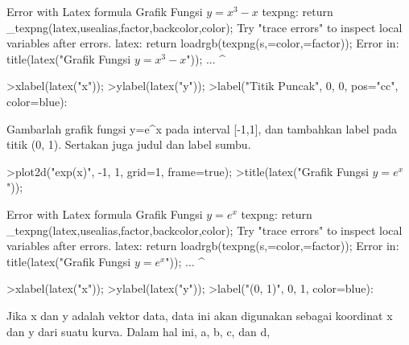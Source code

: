 \documentclass{article}
\begin{document}
\begin{eulernotebook}
\begin{eulercomment}
\begin{eulercomment}
\begin{eulercomment}
\begin{eulercomment}
\begin{eulercomment}
\begin{eulercomment}
\begin{eulercomment}
\begin{eulercomment}
\begin{eulercomment}
\begin{eulercomment}
\begin{eulercomment}
\begin{eulercomment}
\begin{eulercomment}
\begin{eulercomment}
\begin{eulercomment}
\begin{eulercomment}
\begin{eulercomment}
\begin{eulercomment}
\begin{eulerprompt}
\end{eulerprompt}
\begin{euleroutput}
  Error with Latex formula
  Grafik Fungsi $y = x^3 - x$
  texpng:
      return _texpng(latex,usealias,factor,backcolor,color);
  Try "trace errors" to inspect local variables after errors.
  latex:
      return loadrgb(texpng(s,=color,=factor));
  Error in:
  title(latex("Grafik Fungsi $y = x^3 - x$")); ...
                                            ^
\end{euleroutput}
\begin{eulerprompt}
>xlabel(latex("x"));
>ylabel(latex("y"));
>label("Titik Puncak", 0, 0, pos="cc", color=blue):
\end{eulerprompt}
\eulersubheading{}
\begin{eulercomment}
Gambarlah grafik fungsi y=e\textasciicircum{}x pada interval [-1,1], dan tambahkan
label pada titik (0, 1). Sertakan juga judul dan label sumbu.\\
\end{eulercomment}
\eulersubheading{}
\begin{eulerprompt}
>plot2d("exp(x)", -1, 1, grid=1, frame=true);
>title(latex("Grafik Fungsi $y = e^x$"));
\end{eulerprompt}
\begin{euleroutput}
  Error with Latex formula
  Grafik Fungsi $y = e^x$
  texpng:
      return _texpng(latex,usealias,factor,backcolor,color);
  Try "trace errors" to inspect local variables after errors.
  latex:
      return loadrgb(texpng(s,=color,=factor));
  Error in:
  title(latex("Grafik Fungsi $y = e^x$")); ...
                                        ^
\end{euleroutput}
\begin{eulerprompt}
>xlabel(latex("x"));
>ylabel(latex("y"));
>label("(0, 1)", 0, 1, color=blue):
\end{eulerprompt}
\eulersubheading{}
\begin{eulercomment}
\begin{eulercomment}
\begin{eulercomment}
Jika x dan y adalah vektor data, data ini akan digunakan sebagai
koordinat x dan y dari suatu kurva. Dalam hal ini, a, b, c, dan d,

\end{eulercomment}
\end{eulercomment}
\end{eulercomment}
\end{eulercomment}
\end{eulercomment}
\end{eulercomment}
\end{eulercomment}
\end{eulercomment}
\end{eulercomment}
\end{eulercomment}
\end{eulercomment}
\end{eulercomment}
\end{eulercomment}
\end{eulercomment}
\end{eulercomment}
\end{eulercomment}
\end{eulercomment}
\end{eulercomment}
\end{eulercomment}
\end{eulercomment}
\end{eulercomment}
\end{eulernotebook}
\end{document}
